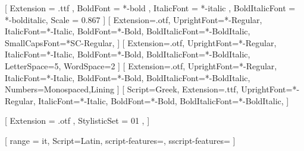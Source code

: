 % 
%
\setmainfont{serif}[
  Extension = .ttf ,
  BoldFont = *-bold ,
  ItalicFont = *-italic ,
  BoldItalicFont = *-bolditalic,
  Scale = 0.867
]
\setsansfont{AlegreyaSans}[
  Extension=.otf,
  UprightFont=*-Regular,
  ItalicFont=*-Italic,
  BoldFont=*-Bold,
  BoldItalicFont=*-BoldItalic,
  SmallCapsFont=*SC-Regular,
]
[
  Extension=.otf,
  UprightFont=*-Regular,
  ItalicFont=*-Italic,
  BoldFont=*-Bold,
  BoldItalicFont=*-BoldItalic,
  LetterSpace=5,
  WordSpace=2
]
[
  Extension=.otf,
  UprightFont=*-Regular,
  ItalicFont=*-Italic,
  BoldFont=*-Bold,
  BoldItalicFont=*-BoldItalic,
  Numbers={Monospaced,Lining}
]
[
  Script=Greek,
  Extension=.ttf,
  UprightFont=*-Regular,
  ItalicFont=*-Italic,
  BoldFont=*-Bold,
  BoldItalicFont=*-BoldItalic,
]

% 
%

\usepackage{unicode-math}

[%
  Extension = .otf ,
  StylisticSet = 01 ,
]

%
%


[%
  range = {it},
  Script=Latin,
  script-features={},
  sscript-features={}
]
